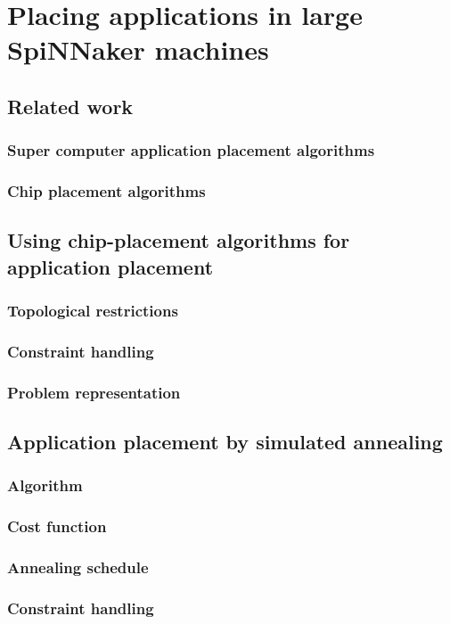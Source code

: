 \chapter{Placing applications in large SpiNNaker machines}

\section{Related work}
	\subsection{Super computer application placement algorithms}
	\subsection{Chip placement algorithms}

\section{Using chip-placement algorithms for application placement}
	\subsection{Topological restrictions}
	\subsection{Constraint handling}
	\subsection{Problem representation}

\section{Application placement by simulated annealing}
	\subsection{Algorithm}
	\subsection{Cost function}
	\subsection{Annealing schedule}
	\subsection{Constraint handling}

